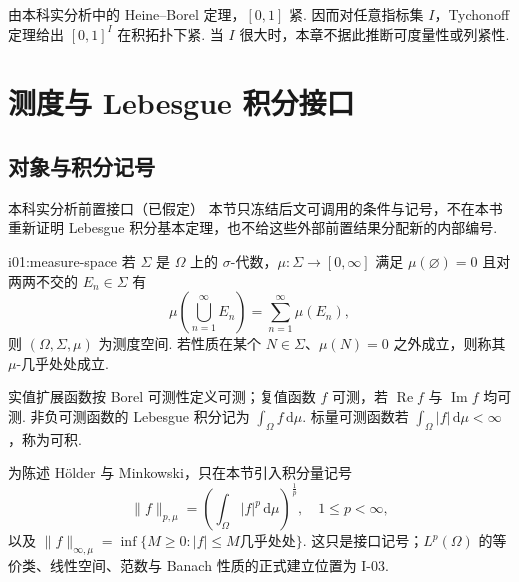 \begin{FAExample}[任意立方体]
由本科实分析中的 Heine--Borel 定理，\(\displaystyle [0,1]\) 紧. 因而对任意指标集 \(\displaystyle I\)，Tychonoff 定理给出 \(\displaystyle [0,1]^I\) 在积拓扑下紧. 当 \(\displaystyle I\) 很大时，本章不据此推断可度量性或列紧性.
\end{FAExample}

\section{测度与 Lebesgue 积分接口}\label{sec:i01-measure}

\subsection{对象与积分记号}

\begin{FALightBox}{本科实分析前置接口（已假定）}
本节只冻结后文可调用的条件与记号，不在本书重新证明 Lebesgue 积分基本定理，也不给这些外部前置结果分配新的内部编号.
\end{FALightBox}

\begin{FADefinition}[C][测度空间与几乎处处]{i01:measure-space}
若 \(\displaystyle \Sigma\) 是 \(\displaystyle \Omega\) 上的 \(\displaystyle \sigma\)-代数，\(\displaystyle \mu:\Sigma\to[0,\infty]\) 满足 \(\displaystyle \mu(\varnothing)=0\) 且对两两不交的 \(\displaystyle E_n\in\Sigma\) 有
\[
\mu\!\left(\bigcup_{n=1}^{\infty}E_n\right)=\sum_{n=1}^{\infty}\mu(E_n),
\]
则 \(\displaystyle (\Omega,\Sigma,\mu)\) 为测度空间. 若性质在某个 \(\displaystyle N\in\Sigma\)、\(\displaystyle \mu(N)=0\) 之外成立，则称其 \(\displaystyle \mu\)-几乎处处成立.

实值扩展函数按 Borel 可测性定义可测；复值函数 \(\displaystyle f\) 可测，若 \(\displaystyle \operatorname{Re}f\) 与 \(\displaystyle \operatorname{Im}f\) 均可测. 非负可测函数的 Lebesgue 积分记为 \(\displaystyle \int_\Omega f\,\mathrm{d}\mu\). 标量可测函数若 \(\displaystyle \int_\Omega |f|\,\mathrm{d}\mu<\infty\)，称为可积.
\end{FADefinition}

为陈述 Hölder 与 Minkowski，只在本节引入积分量记号
\[
\|f\|_{p,\mu}=\left(\int_\Omega |f|^p\,\mathrm{d}\mu\right)^{\frac{1}{p}},\quad 1\leqslant p<\infty,
\]
以及 \(\displaystyle \|f\|_{\infty,\mu}=\inf\{M\geqslant0:|f|\leqslant M\text{几乎处处}\}\).
这只是接口记号；\(\displaystyle L^p(\Omega)\) 的等价类、线性空间、范数与 Banach 性质的正式建立位置为 I-03.

